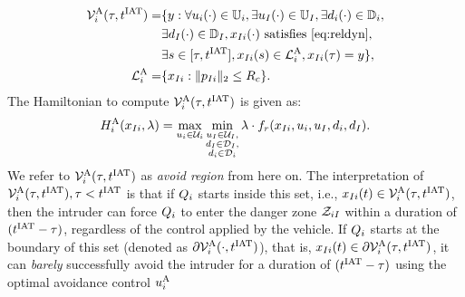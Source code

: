 \begin{equation} \label{eqn:avoidBRS}
\begin{aligned}
\brs^{\text{A}}_{i}(\tau, \iat) = & \{y: \forall \ctrl_i(\cdot) \in \cfset_i, \exists \ctrl_\intr(\cdot) \in \cfset_\intr, \exists \dstb_i(\cdot) \in \dfset_i, \\
& \exists \dstb_\intr(\cdot) \in \dfset_\intr, \state_{\intr i}(\cdot) \text{ satisfies \eqref{eq:reldyn}},\\
& \exists s \in [\tau, \iat], \state_{\intr i}(s) \in \targetset^{\text{A}}_{i}, \state_{\intr i}(\tau) = y\},\\
\targetset^{\text{A}}_{i} = & \{\state_{\intr i}: \|\pos_{\intr i}\|_2 \le \rc\}.
\end{aligned}
\end{equation}
The Hamiltonian to compute $\mathcal{V}^{\text{A}}_{i}(\tau, t^\text{IAT})$ is given as:
\begin{equation}
H^{\text{A}}_{i}(x_{I i}, \lambda) = \max_{u_i \in \mathcal{U}_i} \min_{\substack{u_I \in \mathcal{U}_I, \\ d_I \in \mathcal{D}_I, \\ d_i \in \mathcal{D}_i}} \lambda \cdot f_r(x_{I i}, u_i, u_I, d_i, d_I).
\end{equation}
We refer to $\mathcal{V}^{\text{A}}_i(\tau, t^\text{IAT})$ as \textit{avoid region} from here on. The interpretation of $\mathcal{V}^{\text{A}}_{i}(\tau, t^\text{IAT}), \tau < t^\text{IAT}$ is that if $Q_i$ starts inside this set, i.e., $x_{I i}(t) \in  \mathcal{V}^{\text{A}}_{i}(\tau, t^\text{IAT})$, then the intruder can force $Q_i$ to enter the danger zone $\mathcal{Z}_{iI}$ within a duration of $(t^\text{IAT}-\tau)$, regardless of the control applied by the vehicle. If $Q_i$ starts at the boundary of this set (denoted as $\partial \mathcal{V}^{\text{A}}_{i}(\cdot, t^\text{IAT})$), that is, $x_{I i}(t) \in  \partial \mathcal{V}^{\text{A}}_{i}(\tau, t^\text{IAT})$, it can \textit{barely} successfully avoid the intruder for a duration of $(t^\text{IAT}-\tau)$ using the optimal avoidance control ${u^{\text{A}}_{i}}$ 
